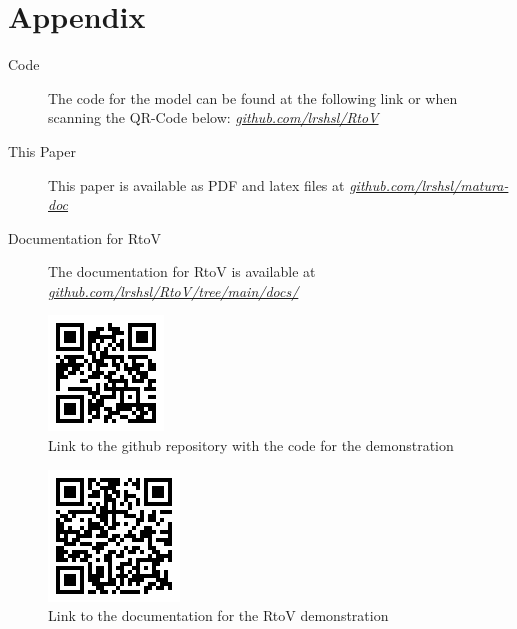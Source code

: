 \documentclass[12pt, a4paper, titlepage]{report}
\let\oldhref\href
\renewcommand{\href}[2]{\oldhref{#1}{\itshape#2}}
\begin{document}
\begin{refcontext}[labelprefix=A]
   \printbibliography[type=misc, keyword={AITool}, title={AI Tools}]
\end{refcontext}



\chapter{Appendix}

\begin{description}
   \item[Code] The code for the model can be found at the following link or when scanning the QR-Code below: \href{https://github.com/lrshsl/rtov.git}{github.com/lrshsl/RtoV}
   \item[This Paper] This paper is available as PDF and latex files at \href{https://github.com/lrshsl/matura-doc/tree/main/matura_thesis}{github.com/lrshsl/matura-doc}
   \item[Documentation for RtoV] The documentation for RtoV is available at\\ \href{https://github.com/lrshsl/rtov/tree/main/docs/}{github.com/lrshsl/RtoV/tree/main/docs/}
\end{description}


\begin{figure}[H]
   \centering
   \includegraphics{../rc/images/QrCode_LinkRepo.png}
   \caption{Link to the github repository with the code for the demonstration}
\end{figure}


\begin{figure}[H]
   \centering
   \includegraphics{../rc/images/QrCode_LinkDocs.png}
   \caption{Link to the documentation for the RtoV demonstration}
\end{figure}
\end{document}
